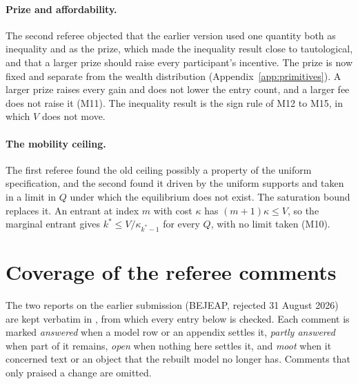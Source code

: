 \paragraph{Prize and affordability.} The second referee objected that the
earlier version used one quantity both as inequality and as the prize, which
made the inequality result close to tautological, and that a larger prize
should raise every participant's incentive. The prize is now fixed and
separate from the wealth distribution (Appendix~\ref{app:primitives}). A larger
prize raises every gain and does not lower the entry count, and a larger fee
does not raise it (M11).
The inequality result is the sign rule of M12 to M15, in which $V$ does not
move.

\paragraph{The mobility ceiling.} The first referee found the old ceiling
possibly a property of the uniform specification, and the second found it
driven by the uniform supports and taken in a limit in $Q$ under which the
equilibrium does not exist. The saturation bound replaces it. An entrant at
index $m$ with cost $\kappa$ has $(m+1)\kappa\le V$, so the marginal entrant
gives $k^*\le V/\kappa_{k^*-1}$ for every $Q$, with no limit taken (M10).

\section{Coverage of the referee comments}
\label{app:coverage}

The two reports on the earlier submission (BEJEAP, rejected 31 August 2026)
are kept verbatim in , from
which every entry below is checked.
Each comment is marked \emph{answered} when a model row or an appendix settles
it, \emph{partly answered} when part of it remains, \emph{open} when nothing
here settles it, and \emph{moot} when it concerned text or an object that the
rebuilt model no longer has. Comments that only praised a change are omitted.

